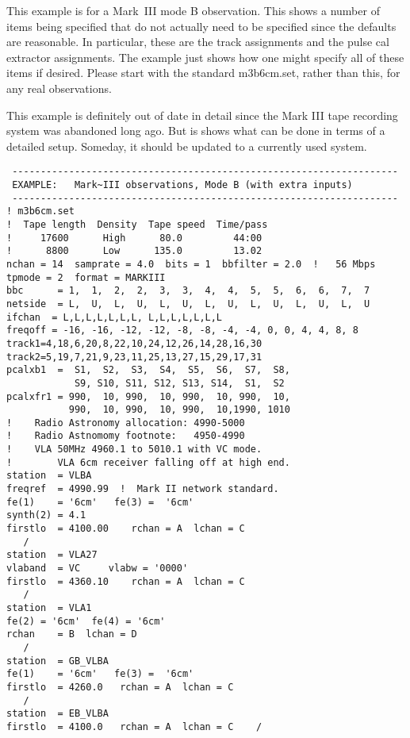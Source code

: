 \documentclass{report}
\begin{document}


\newpage

This example is for a Mark~III mode B observation.  This shows a
number of items being specified that do not actually need to be
specified since the defaults are reasonable.  In particular, these
are the track assignments and the pulse cal extractor assignments.
The example just shows how one might specify all of these items
if desired.  Please start with the standard m3b6cm.set, rather than
this, for any real observations.

This example is definitely out of date in detail since the Mark III
tape recording system was abandoned long ago.  But is shows what can
be done in terms of a detailed setup.  Someday, it should be updated
to a currently used system.


\begin{verbatim}
 --------------------------------------------------------------------
 EXAMPLE:   Mark~III observations, Mode B (with extra inputs)
 --------------------------------------------------------------------
! m3b6cm.set
!  Tape length  Density  Tape speed  Time/pass
!     17600      High      80.0         44:00
!      8800      Low      135.0         13.02
nchan = 14  samprate = 4.0  bits = 1  bbfilter = 2.0  !   56 Mbps
tpmode = 2  format = MARKIII
bbc      = 1,  1,  2,  2,  3,  3,  4,  4,  5,  5,  6,  6,  7,  7
netside  = L,  U,  L,  U,  L,  U,  L,  U,  L,  U,  L,  U,  L,  U
ifchan  = L,L,L,L,L,L,L, L,L,L,L,L,L,L
freqoff = -16, -16, -12, -12, -8, -8, -4, -4, 0, 0, 4, 4, 8, 8
track1=4,18,6,20,8,22,10,24,12,26,14,28,16,30
track2=5,19,7,21,9,23,11,25,13,27,15,29,17,31
pcalxb1  =  S1,  S2,  S3,  S4,  S5,  S6,  S7,  S8,
            S9, S10, S11, S12, S13, S14,  S1,  S2
pcalxfr1 = 990,  10, 990,  10, 990,  10, 990,  10,
           990,  10, 990,  10, 990,  10,1990, 1010
!    Radio Astronomy allocation: 4990-5000
!    Radio Astnomomy footnote:   4950-4990
!    VLA 50MHz 4960.1 to 5010.1 with VC mode.
!        VLA 6cm receiver falling off at high end.
station  = VLBA
freqref  = 4990.99  !  Mark II network standard.
fe(1)    = '6cm'   fe(3) =  '6cm'
synth(2) = 4.1
firstlo  = 4100.00    rchan = A  lchan = C
   /
station  = VLA27
vlaband  = VC     vlabw = '0000'
firstlo  = 4360.10    rchan = A  lchan = C
   /
station  = VLA1
fe(2) = '6cm'  fe(4) = '6cm'
rchan    = B  lchan = D
   /
station  = GB_VLBA
fe(1)    = '6cm'   fe(3) =  '6cm'
firstlo  = 4260.0   rchan = A  lchan = C
   /
station  = EB_VLBA
firstlo  = 4100.0   rchan = A  lchan = C    /
\end{verbatim}
\end{document}
